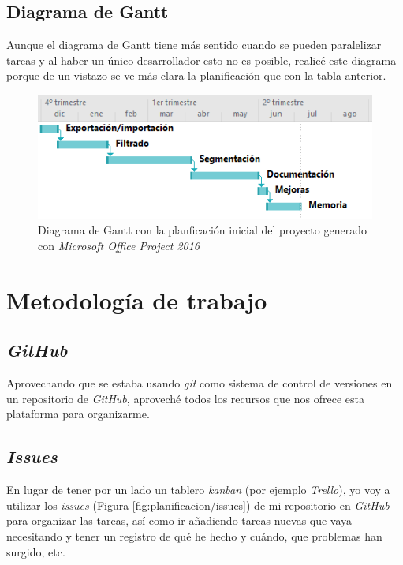 \subsection{Diagrama de Gantt}

Aunque el diagrama de Gantt tiene más sentido cuando se pueden paralelizar tareas y al haber un único desarrollador esto no es posible, realicé este diagrama porque de un vistazo se ve más clara la planificación que con la tabla anterior.

\begin{figure}[H]
	\centering
	\includegraphics[width=12cm]{imagenes/planificacion/gantt}
	\caption{Diagrama de Gantt con la planficación inicial del proyecto generado con \textit{Microsoft Office Project 2016}}
	\label{fig:planificacion/gantt}
\end{figure}


\section{Metodología de trabajo}

\subsection{\textit{GitHub}}

Aprovechando que se estaba usando \textit{git} como sistema de control de versiones en un repositorio de \textit{GitHub}, aproveché todos los recursos que nos ofrece esta plataforma para organizarme. 

\subsection{\textit{Issues}}

En lugar de tener por un lado un tablero \textit{kanban} (por ejemplo \textit{Trello}), yo voy a utilizar los \textit{issues} (Figura \ref{fig:planificacion/issues}) de mi repositorio en \textit{GitHub} para organizar las tareas, así como ir añadiendo tareas nuevas que vaya necesitando y tener un registro de qué he hecho y cuándo, que problemas han surgido, etc.

